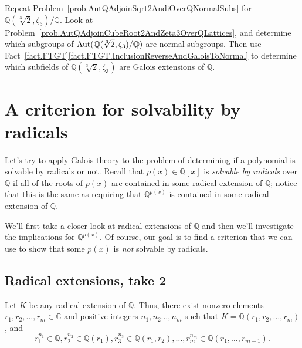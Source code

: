 \begin{problem}
Repeat Problem~\ref{prob.AutQAdjoinSqrt2AndiOverQNormalSubs} for $\mathbb{Q}(\sqrt[3]{2},\zeta_3)/\mathbb{Q}$. Look  at Problem~\ref{prob.AutQAdjoinCubeRoot2AndZeta3OverQLattices}, and determine which subgroups of $\operatorname{Aut}(\mathbb{Q}(\sqrt[3]{2},\zeta_3)/\mathbb{Q})$ are normal subgroups. Then use Fact~\ref{fact.FTGT}\ref{fact.FTGT.InclusionReverseAndGaloisToNormal} to determine which subfields of $\mathbb{Q}(\sqrt[3]{2},\zeta_3)$ are Galois extensions of $\mathbb{Q}$.
\end{problem}

\section{A criterion for solvability by radicals}

Let's try to apply Galois theory to the problem of determining if a polynomial is solvable by radicals or not. Recall that $p(x)\in \mathbb{Q}[x]$ is \emph{solvable by radicals} over $\mathbb{Q}$ if all of the roots of $p(x)$ are contained in some radical extension of $\mathbb{Q}$; notice that this is the same as requiring that $\mathbb{Q}^{p(x)}$ is contained in some radical extension of $\mathbb{Q}$. 

We'll first take a closer look at radical extensions of $\mathbb{Q}$ and then we'll investigate the implications for $\mathbb{Q}^{p(x)}$. Of course, our goal is to find a criterion that we can use to show that some $p(x)$ is \emph{not} solvable by radicals.

\subsection{Radical extensions, take 2}
Let $K$ be any radical extension of $\mathbb{Q}$. Thus, there exist nonzero elements $r_1,r_2,\ldots,r_m\in \mathbb{C}$ and positive integers $n_1,n_2\ldots,n_m$ such that $K = \mathbb{Q}(r_1,r_2,\ldots,r_m)$, and 
\[r_1^{n_1} \in \mathbb{Q}, r_2^{n_2} \in \mathbb{Q}(r_1), r_3^{n_3} \in \mathbb{Q}(r_1,r_2), \ldots, r_m^{n_m} \in \mathbb{Q}(r_1,\ldots,r_{m-1}).\]

